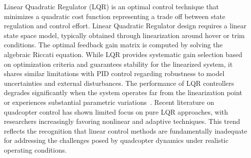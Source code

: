 

Linear Quadratic Regulator (LQR) is an optimal control technique that minimizes a quadratic cost function representing a trade off between state regulation and control effort. Linear Quadratic Regulator design requires a linear state space model, typically obtained through linearization around hover or trim conditions. The optimal feedback gain matrix is computed by solving the algebraic Riccati equation. While LQR provides systematic gain selection based on optimization criteria and guarantees stability for the linearized system, it shares similar limitations with PID control regarding robustness to model uncertainties and external disturbances. The performance of LQR controllers degrades significantly when the system operates far from the linearization point or experiences substantial parametric variations~\cite{samy2024robust,labbadi2020novel}. Recent literature on quadcopter control has shown limited focus on pure LQR approaches, with researchers increasingly favoring nonlinear and adaptive techniques. This trend reflects the recognition that linear control methods are fundamentally inadequate for addressing the challenges posed by quadcopter dynamics under realistic operating conditions.



